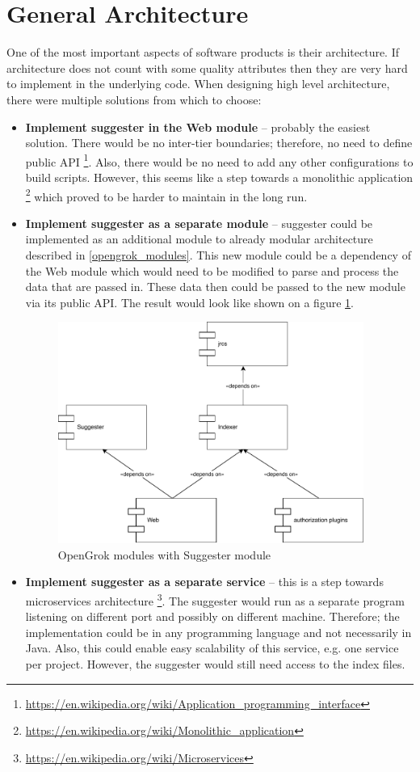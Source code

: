 \section{General Architecture}
\label{general_architecture}
One of the most important aspects of software products is their architecture. If architecture does not count with some
quality attributes then they are very hard to implement in the underlying code. When designing high level architecture,
there were multiple solutions from which to choose:
\begin{itemize}
    \item \textbf{Implement suggester in the Web module} – probably the easiest solution. There would be no inter-tier
    boundaries; therefore, no need to define public API
    \footnote{\url{https://en.wikipedia.org/wiki/Application\_programming\_interface}}. Also, there would be no need
    to add any other configurations to build scripts. However, this seems like a step towards a monolithic application
    \footnote{\url{https://en.wikipedia.org/wiki/Monolithic\_application}} which proved to be harder to maintain in the
    long run.
    \item \textbf{Implement suggester as a separate module} – suggester could be implemented as an additional module to
    already modular architecture described in \ref{opengrok_modules}. This new module could be a dependency of the Web
    module which would need to be modified to parse and process the data that are passed in. These data then could be
    passed to the new module via its public API. The result would look like shown on a figure \ref{opengrok_modules_changed_img}.
    \begin{figure}[htbp]
    \centering
    \includegraphics[width=100mm]{../img/opengrok_modules_changed.pdf}
    \caption{OpenGrok modules with Suggester module}
    \label{opengrok_modules_changed_img}
    \end{figure}
    \item \textbf{Implement suggester as a separate service} – this is a step towards microservices architecture
    \footnote{\url{https://en.wikipedia.org/wiki/Microservices}}. The suggester would run as a separate program
    listening on different port and possibly on different machine. Therefore; the implementation could be in any
    programming language and not necessarily in Java. Also, this could enable easy scalability of this service,
    e.g. one service per project. However, the suggester would still need access to the index files.
\end{itemize}

